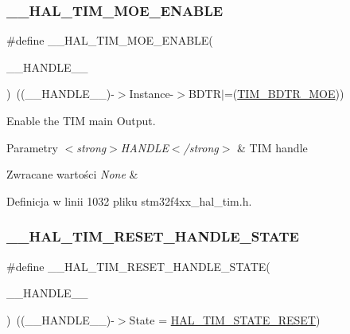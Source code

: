 \subsubsection{\texorpdfstring{\+\_\+\+\_\+\+H\+A\+L\+\_\+\+T\+I\+M\+\_\+\+M\+O\+E\+\_\+\+E\+N\+A\+B\+LE}{\_\_HAL\_TIM\_MOE\_ENABLE}}
{\footnotesize\ttfamily \#define \+\_\+\+\_\+\+H\+A\+L\+\_\+\+T\+I\+M\+\_\+\+M\+O\+E\+\_\+\+E\+N\+A\+B\+LE(\begin{DoxyParamCaption}\item[{}]{\+\_\+\+\_\+\+H\+A\+N\+D\+L\+E\+\_\+\+\_\+ }\end{DoxyParamCaption})~((\+\_\+\+\_\+\+H\+A\+N\+D\+L\+E\+\_\+\+\_\+)-\/$>$Instance-\/$>$B\+D\+TR$\vert$=(\hyperlink{group___peripheral___registers___bits___definition_ga277a096614829feba2d0a4fbb7d3dffc}{T\+I\+M\+\_\+\+B\+D\+T\+R\+\_\+\+M\+OE}))}



Enable the T\+IM main Output. 


\begin{DoxyParams}{Parametry}
{\em $<$strong$>$\+H\+A\+N\+D\+L\+E$<$/strong$>$} & T\+IM handle \\
\hline
\end{DoxyParams}

\begin{DoxyRetVals}{Zwracane wartości}
{\em None} & \\
\hline
\end{DoxyRetVals}


Definicja w linii 1032 pliku stm32f4xx\+\_\+hal\+\_\+tim.\+h.

\mbox{\label{group___t_i_m___exported___macros_gace20fd4e38231b9682fbc83a80ec19a3}} 
\subsubsection{\texorpdfstring{\+\_\+\+\_\+\+H\+A\+L\+\_\+\+T\+I\+M\+\_\+\+R\+E\+S\+E\+T\+\_\+\+H\+A\+N\+D\+L\+E\+\_\+\+S\+T\+A\+TE}{\_\_HAL\_TIM\_RESET\_HANDLE\_STATE}}
{\footnotesize\ttfamily \#define \+\_\+\+\_\+\+H\+A\+L\+\_\+\+T\+I\+M\+\_\+\+R\+E\+S\+E\+T\+\_\+\+H\+A\+N\+D\+L\+E\+\_\+\+S\+T\+A\+TE(\begin{DoxyParamCaption}\item[{}]{\+\_\+\+\_\+\+H\+A\+N\+D\+L\+E\+\_\+\+\_\+ }\end{DoxyParamCaption})~((\+\_\+\+\_\+\+H\+A\+N\+D\+L\+E\+\_\+\+\_\+)-\/$>$State = \hyperlink{group___t_i_m___exported___types_ggae0994cf5970e56ca4903e9151f40010ca28011b79e60b74a6c55947c505c51cbc}{H\+A\+L\+\_\+\+T\+I\+M\+\_\+\+S\+T\+A\+T\+E\+\_\+\+R\+E\+S\+ET})}



